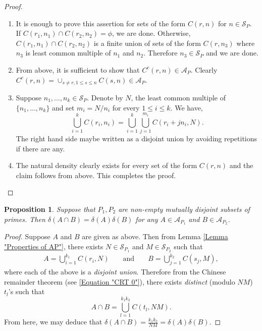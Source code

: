 \documentclass[12pt, a4paper]{amsart}
\newtheorem{proposition}{Proposition}
\theoremstyle{remark}
\theoremstyle{proof}
\numberwithin{equation}{section}
\numberwithin{assumption}{section}
\begin{document}
	\begin{proof}
		\begin{enumerate}
			\item	It is enough to prove this assertion for sets of the form $C(r,n)$ for $n\in \mathcal{S}_P$. If $C(r_1,n_1)\cap C(r_2,n_2) = \phi$, we are done. Otherwise, $C(r_1, n_1)\cap C(r_2, n_2)$ is a finite union of sets of the form $C(r,n_3)$ where $n_3$ is least common multiple of $n_1$ and $n_2$. Therefore $n_3\in \mathcal{S}_P$ and we are done.
			\item 	From above, it is sufficient to show that $C^c(r,n)\in \mathcal{A}_P$. Clearly $C^c(r,n) = \cup_{s\neq r, 1\leqslant s\leqslant n} C(s,n)\in \mathcal{A}_P$.
			\item 	Suppose $n_1, \ldots, n_k\in \mathcal{S}_P$. Denote by $N$, the least common multiple of $\{n_1,\ldots, n_k\}$ and set $m_i = N/n_i$ for every $1\leqslant i \leqslant k$. We have,
			\[
			\bigcup_{i=1}^{k} C(r_i, n_i) = \bigcup_{i=1}^{k} \bigcup_{j=1}^{m_i} C(r_i + jn_i, N).
			\]
			The right hand side maybe written as a disjoint union by avoiding repetitions if there are any. 
			\item 	The natural density clearly exists for every set of the form $C(r,n)$ and the claim follows from above. This completes the proof.
		\end{enumerate}
	\end{proof}
		
	\begin{proposition}\label{Proposition "Multiplicative AP"}
		 Suppose that $P_1, P_2$ are non-empty mutually disjoint subsets of primes. Then $\delta(A\cap B) = \delta(A)\delta(B)$ for any $A\in \mathcal{A}_{P_1}$ and $B\in \mathcal{A}_{P_2}$.
	\end{proposition}
	
	\begin{proof}
		Suppose $A$ and $B$ are given as above. Then from Lemma \ref{Lemma "Properties of AP"}, there exists $N\in \mathcal{S}_{P_1}$ and $M\in \mathcal{S}_{P_2}$ such that 
		\begin{align*}
			A = \bigcup_{i=1}^{k_1} C(r_i, N) && \mbox{ and }&&B = \bigcup_{j=1}^{k_2} C(s_j, M),
		\end{align*}
		where each of the above is a \textit{disjoint union}. Therefore from the Chinese remainder theorem (see \eqref{Equation "CRT 0"}), there exists \textit{distinct} (modulo $NM$) $t_l$'s such that
		\[
		A\cap B = \bigcup_{l=1}^{k_1k_2} C(t_l, NM).
		\]
		From here, we may deduce that $\delta(A\cap B) = \frac{k_1k_2}{NM} = \delta(A)\delta(B)$.
	\end{proof}
	
\end{document}
